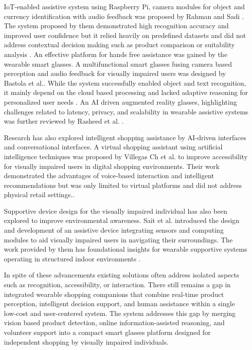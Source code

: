 \documentclass[conference]{IEEEtran}
\begin{document}
IoT-enabled assistive system using Raspberry Pi, camera modules for object and currency identification with audio feedback was proposed by Rahman and Sadi \cite{b4}. The system proposed by them demonstrated high recognition accuracy and improved user confidence but it relied heavily on predefined datasets and did not address contextual decision making such as product comparison or suitability analysis \cite {b4}.
An effective platform for hands free assistance was gained by the wearable smart glasses. A multifunctional smart glasses fusing camera based perception and audio feedback for visually impaired users was designed by Bastola et al.\cite{b1}. While the system successfully enabled object and text recognition, it mainly depend on the cloud based processing and lacked adaptive reasoning for personalized user needs \cite {b1}. An AI driven augmented reality glasses, highlighting challenges related to latency, privacy, and scalability in wearable assistive systems was further reviewed by Rasheed et al. \cite{b5}.

Research has also explored intelligent shopping assistance by AI-driven interfaces and conversational interfaces. A virtual shopping assistant using artificial intelligence techniques was proposed by Villegas Ch et al. \cite{b3} to improve accessibility for visually impaired users in digital shopping environments. Their work demonstrated the advantages
 of voice-based interaction and intelligent recommendations but was only limited to virtual platforms and did not address physical retail settings.\cite{b3}.

Supportive device design for the visually impaired individual has also been explored to improve environmental awareness. Sait et al. \cite{b2} introduced the design and development of an assistive device integrating sensors and computing modules to aid visually impaired users in navigating their surroundings. The work provided by them has foundational insights for wearable supportive systems operating in structured indoor environments \cite{b2}.

In spite of these advancements existing solutions often address isolated aspects such as recognition, accessibility, or interaction. There still remains a gap in integrated wearable shopping companions that combine real-time product perception, intelligent decision support, and human assistance within a single low-cost and user-centered system. The system addresses this gap by merging vision based product detection, online information-assisted reasoning, and volunteer support into a compact smart glasses platform designed for independent shopping by visually impaired individuals.
\end{document}
